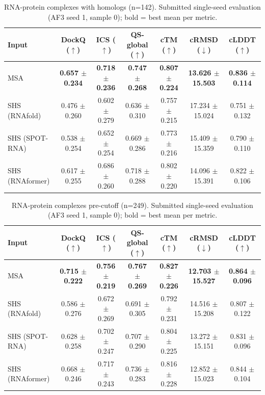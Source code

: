 \begin{table}[htbp]
\centering
\caption{RNA-protein complexes with homologs (n=142). Submitted single-seed evaluation (AF3 seed 1, sample 0); bold = best mean per metric.}
\label{tab:rna_protein_complexes_with_homologs}
\begin{tabular}{lcccccc}
\toprule
Input & DockQ ($\uparrow$) & ICS ($\uparrow$) & QS-global ($\uparrow$) & cTM ($\uparrow$) & cRMSD ($\downarrow$) & cLDDT ($\uparrow$) \\
\midrule
MSA & \textbf{0.657 $\pm$ 0.234} & \textbf{0.718 $\pm$ 0.236} & \textbf{0.747 $\pm$ 0.268} & \textbf{0.807 $\pm$ 0.224} & \textbf{13.626 $\pm$ 15.503} & \textbf{0.836 $\pm$ 0.114} \\
SHS (RNAfold) & 0.476 $\pm$ 0.260 & 0.602 $\pm$ 0.279 & 0.636 $\pm$ 0.310 & 0.757 $\pm$ 0.215 & 17.234 $\pm$ 15.024 & 0.751 $\pm$ 0.132 \\
SHS (SPOT-RNA) & 0.538 $\pm$ 0.254 & 0.652 $\pm$ 0.254 & 0.669 $\pm$ 0.286 & 0.773 $\pm$ 0.216 & 15.409 $\pm$ 15.359 & 0.790 $\pm$ 0.110 \\
SHS (RNAformer) & 0.617 $\pm$ 0.255 & 0.686 $\pm$ 0.260 & 0.718 $\pm$ 0.288 & 0.802 $\pm$ 0.220 & 14.096 $\pm$ 15.391 & 0.822 $\pm$ 0.106 \\
\bottomrule
\end{tabular}
\end{table}

\begin{table}[htbp]
\centering
\caption{RNA-protein complexes pre-cutoff (n=249). Submitted single-seed evaluation (AF3 seed 1, sample 0); bold = best mean per metric.}
\label{tab:rna_protein_complexes_pre_cutoff}
\begin{tabular}{lcccccc}
\toprule
Input & DockQ ($\uparrow$) & ICS ($\uparrow$) & QS-global ($\uparrow$) & cTM ($\uparrow$) & cRMSD ($\downarrow$) & cLDDT ($\uparrow$) \\
\midrule
MSA & \textbf{0.715 $\pm$ 0.222} & \textbf{0.756 $\pm$ 0.219} & \textbf{0.767 $\pm$ 0.269} & \textbf{0.827 $\pm$ 0.226} & \textbf{12.703 $\pm$ 15.527} & \textbf{0.864 $\pm$ 0.096} \\
SHS (RNAfold) & 0.586 $\pm$ 0.276 & 0.672 $\pm$ 0.269 & 0.691 $\pm$ 0.305 & 0.792 $\pm$ 0.231 & 14.516 $\pm$ 15.208 & 0.807 $\pm$ 0.122 \\
SHS (SPOT-RNA) & 0.628 $\pm$ 0.258 & 0.702 $\pm$ 0.247 & 0.707 $\pm$ 0.290 & 0.804 $\pm$ 0.225 & 13.272 $\pm$ 15.151 & 0.831 $\pm$ 0.096 \\
SHS (RNAformer) & 0.668 $\pm$ 0.246 & 0.717 $\pm$ 0.243 & 0.736 $\pm$ 0.283 & 0.816 $\pm$ 0.228 & 12.852 $\pm$ 15.023 & 0.844 $\pm$ 0.104 \\
\bottomrule
\end{tabular}
\end{table}

